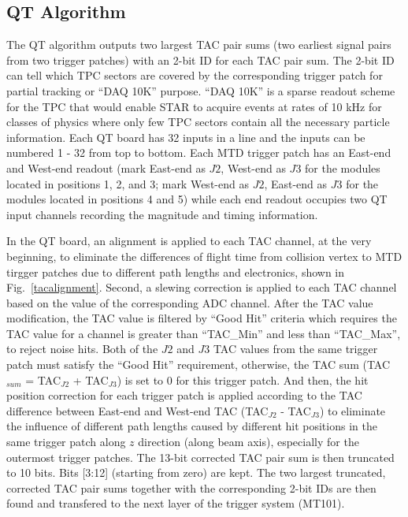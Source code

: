\subsection{QT Algorithm}
The QT algorithm outputs two largest TAC pair sums (two earliest signal pairs from two trigger patches) with an 2-bit ID for each TAC pair sum. The 2-bit ID can tell which TPC sectors are covered by the corresponding trigger patch for partial tracking or ``DAQ 10K'' purpose. ``DAQ 10K'' is a sparse readout scheme for the TPC that would enable STAR to acquire events at rates of 10 kHz for classes of physics where only few TPC sectors contain all the necessary particle information. Each QT board has 32 inputs in a line and the inputs can be numbered 1 - 32 from top to bottom. Each MTD trigger patch has an East-end and West-end readout (mark East-end as $J2$, West-end as $J3$ for the modules located in positions 1, 2, and 3; mark West-end as $J2$, East-end as $J3$ for the modules located in positions 4 and 5) while each end readout occupies two QT input channels recording the magnitude and timing information.

In the QT board, an alignment is applied to each TAC channel, at the very beginning, to eliminate the differences of flight time from collision vertex to MTD tirgger patches due to different path lengths and electronics, shown in Fig.~\ref{tacalignment}. Second, a slewing correction is applied to each TAC channel based on the value of the corresponding ADC channel. After the TAC value modification, the TAC value is filtered by ``Good Hit'' criteria which requires the TAC value for a channel is greater than ``TAC\_Min'' and less than ``TAC\_Max'', to reject noise hits. Both of the $J2$ and $J3$ TAC values from the same trigger patch must satisfy the ``Good Hit'' requirement, otherwise, the TAC sum (TAC$_{sum}$ = TAC$_{J2}$ + TAC$_{J3}$) is set to 0 for this trigger patch. And then, the hit position correction for each trigger patch is applied according to the TAC difference between East-end and West-end TAC (TAC$_{J2}$ - TAC$_{J3}$) to eliminate the influence of different path lengths caused by different hit positions in the same trigger patch along $z$ direction (along beam axis), especially for the outermost trigger patches. The 13-bit corrected TAC pair sum is then truncated to 10 bits. Bits [3:12] (starting from zero) are kept. The two largest truncated, corrected TAC pair sums together with the corresponding 2-bit IDs are then found and transfered to the next layer of the trigger system (MT101).

